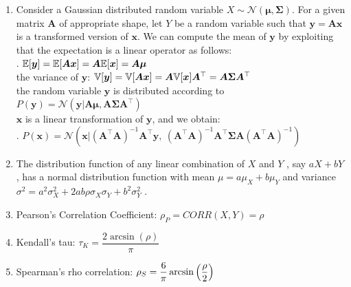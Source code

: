 \begin{enumerate}[series=binvar-normal]
    \item Consider a Gaussian distributed random variable $X \sim \mathcal{N}(\bm{\mu }, \bm{\Sigma})$. 
    For a given matrix $\bm{A}$ of appropriate shape, let $Y$ be a random variable such that $\bm{y} = \bm{Ax}$ is a transformed version of $\bm{x}$. 
    We can compute the mean of $\bm{y}$ by exploiting that the expectation is a linear operator as follows:
    \hfill \cite{mfml/book/mml/Deisenroth-Faisal-Ong}
    \\[0.2cm]
    .\hfill
    $
        \mathbb{E}[\bm{y}] = \mathbb{E}[\bm{Ax}] = \bm{A}\mathbb{E}[\bm{x}] = \bm{A\mu }
    $
    \hfill \cite{mfml/book/mml/Deisenroth-Faisal-Ong}
    \\[0.2cm]
    the variance of $\bm{y}$: $ \mathbb{V}[\bm{y}] = \mathbb{V}[\bm{Ax}] = \bm{A}\mathbb{V}[\bm{x}]\bm{A}^\top = \bm{A\Sigma A}^\top $
    \hfill \cite{mfml/book/mml/Deisenroth-Faisal-Ong}
    \\[0.2cm]
    the random variable $\bm{y}$ is distributed according to $ P(\bm{y}) = \mathcal{N} (\bm{y} | \bm{A\mu}, \bm{A\Sigma A}^\top) $
    \hfill \cite{mfml/book/mml/Deisenroth-Faisal-Ong}
    \\[0.2cm]
    $\bm{x}$ is a linear transformation of $\bm{y}$, and we obtain:
    \hfill \cite{mfml/book/mml/Deisenroth-Faisal-Ong}
    \\[0.2cm]
    .\hfill
    $
        P(\bm{x}) = \mathcal{N} (\bm{x} | (\bm{A}^\top\bm{A})^{-1}\bm{A}^\top \bm{y}, \ (\bm{A}^\top\bm{A})^{-1}\bm{A}^\top \bm{\Sigma A}(\bm{A}^\top\bm{A})^{-1})
    $
    \hfill \cite{mfml/book/mml/Deisenroth-Faisal-Ong}
    

    \item The distribution function of any linear combination of $X$ and $Y$ , say $a X + bY$ , has a normal distribution function with mean $\mu = a\mu_X + b\mu_Y$ and variance $\sigma ^2 = a^2\sigma ^2_X + 2ab\rho \sigma _X \sigma _Y + b^2\sigma ^2_Y$ .
    \hfill \cite{statistics/book/Statistics-for-Data-Scientists/Maurits-Kaptein}

    \item Pearson’s Correlation Coefficient: $\rho_P = CORR(X, Y) = \rho$
    \hfill \cite{statistics/book/Statistics-for-Data-Scientists/Maurits-Kaptein}

    \item Kendall’s tau: $\tau_K = \dfrac{2 \arcsin(\rho)}{\pi}$
    \hfill \cite{statistics/book/Statistics-for-Data-Scientists/Maurits-Kaptein}

    \item Spearman’s rho correlation: $\rho_S = \dfrac{6}{\pi}\arcsin\left(\dfrac{\rho}{2}\right)$
    \hfill \cite{statistics/book/Statistics-for-Data-Scientists/Maurits-Kaptein}


\end{enumerate}
